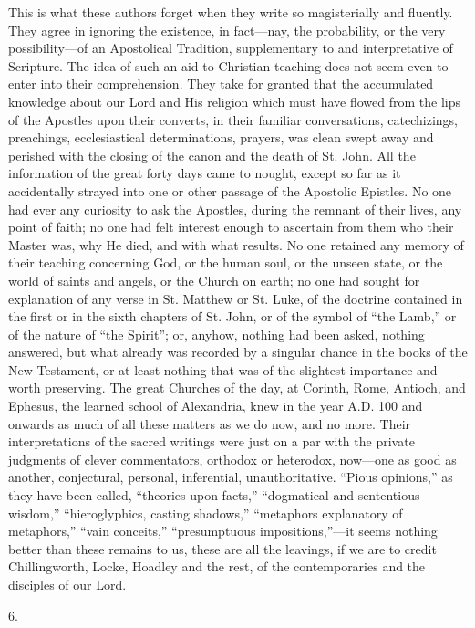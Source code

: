 This is what these authors forget when they write
so magisterially and fluently. They agree in ignoring the existence,
in fact—nay, the probability, or the very possibility—of an
Apostolical Tradition, supplementary to and interpretative of
Scripture. The idea of such an aid to Christian teaching does not seem
even to enter into their comprehension. They take for granted that the
accumulated knowledge about our Lord and His religion which must have
flowed from the lips of the Apostles upon their converts, in their
familiar conversations, catechizings, preachings, ecclesiastical
determinations, prayers, was clean swept away and perished with the
closing of the canon and the death of St. John. All the information of
the great forty days came to nought, except so far as it accidentally
strayed into one or other passage of the Apostolic Epistles. No one
had ever any curiosity to ask the Apostles, during the remnant of
their lives, any point of faith; no one had felt interest enough
to ascertain from them who their Master was, why He died, and with
what results. No one retained any memory of their teaching concerning
God, or the human soul, or the unseen state, or the world of saints
and angels, or the Church on earth; no one had sought for explanation
of any verse in St. Matthew or St. Luke, of the doctrine contained in
the first or in the sixth chapters of St. John, or of the symbol of ``the
Lamb,'' or of the nature of ``the Spirit''; or, anyhow, nothing had been
asked, nothing answered, but what already was recorded by a singular
chance in the books of the New Testament, or at least nothing that was
of the slightest importance and worth preserving. The great Churches
of the day, at Corinth, Rome, Antioch, and Ephesus, the learned school
of Alexandria, knew in the year A.D.
100 and onwards as much of all these matters as we do now, and no
more. Their interpretations of the sacred writings were just on a par
with the private judgments of clever commentators, orthodox or
heterodox, now—one as good as another, conjectural, personal,
inferential, unauthoritative. ``Pious opinions,'' as they have been
called, ``theories upon facts,'' ``dogmatical and sententious wisdom,'' ``hieroglyphics,
casting shadows,'' ``metaphors explanatory of metaphors,'' ``vain
conceits,'' ``presumptuous impositions,''—it seems nothing better
than these remains to us, these are all the leavings, if we are to
credit Chillingworth, Locke, Hoadley and the rest, of the
contemporaries and the disciples of our Lord.

6.

